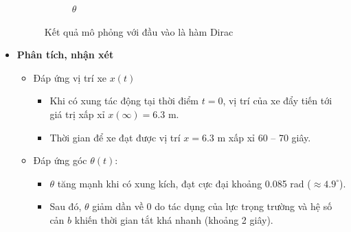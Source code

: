 \documentclass[12pt,a4paper]{article}
\begin{document}
\begin{itemize}
\begin{figure}[ht]
\begin{subfigure}[b]{0.495\linewidth}
            \caption{$\theta$}
        \end{subfigure}
        \caption{Kết quả mô phỏng với đầu vào là hàm Dirac}
    \end{figure}
    \item \textbf{Phân tích, nhận xét}
    \begin{itemize}
        \item Đáp ứng vị trí xe $x(t)$
        \begin{itemize}[noitemsep]
            \item Khi có xung tác động tại thời điểm $t=0$, vị trí của xe đẩy tiến tới giá trị xấp xỉ $x(\infty) = 6.3$ m. 
            \item Thời gian để xe đạt được vị trí $x=6.3$ m xấp xỉ 60 -- 70 giây.
        \end{itemize} 
        \item Đáp ứng góc $\theta(t)$:
        \begin{itemize}[noitemsep]
            \item $\theta$ tăng mạnh khi có xung kích, đạt cực đại khoảng 0.085 rad ($\approx 4.9^\circ$).
            \item Sau đó, $\theta$ giảm dần về 0 do tác dụng của lực trọng trường và hệ số cản $b$ khiến thời gian tắt khá nhanh (khoảng 2 giây).
        \end{itemize} 
    \end{itemize}
\end{itemize}
\end{document}
